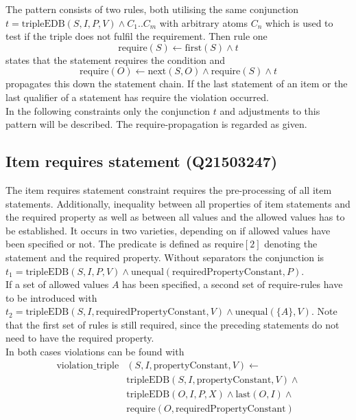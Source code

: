 \documentclass[hyperref,bachelorofscience,fleqn]{cgvpub}
\begin{document}
The pattern consists of two rules, both utilising the same conjunction \(t = \text{tripleEDB}(S, I, P, V) \wedge C_1 .. C_m\) with arbitrary atoms \(C_n\) which is used to test if the triple does not fulfil the requirement. Then rule one
\begin{equation*}
\text{require}(S) \leftarrow \text{first}(S) \wedge t
\end{equation*}
states that the statement requires the condition and
\begin{equation*}
\text{require}(O) \leftarrow \text{next}(S, O) \wedge \text{require}(S) \wedge t
\end{equation*}
propagates this down the statement chain. If the last statement of an item or the last qualifier of a statement has require the violation occurred.\\

In the following constraints only the conjunction \(t\) and adjustments to this pattern will be described. The require-propagation is regarded as given.

\subsection{Item requires statement (Q21503247)}
The item requires statement constraint requires the pre-processing of all item statements. Additionally, inequality between all properties of item statements and the required property as well as between all values and the allowed values has to be established. It occurs in two varieties, depending on if allowed values have been specified or not. The predicate is defined as require\([2]\) denoting the statement and the required property. Without separators the conjunction is \(t_1 = \text{tripleEDB}(S, I, P, V) \wedge \text{unequal}(\text{requiredPropertyConstant}, P)\).\\

If a set of allowed values \(A\) has been specified, a second set of require-rules have to be introduced with \(t_2 = \text{tripleEDB}(S, I, \text{requiredPropertyConstant}, V) \wedge \text{unequal}(\{A\}, V)\). Note that the first set of rules is still required, since the preceding statements do not need to have the required property.\\

In both cases violations can be found with
\begin{equation*}
\begin{split}
\text{violation\_triple}&(S, I, \text{propertyConstant}, V) \leftarrow \\
&\text{tripleEDB}(S, I, \text{propertyConstant}, V) \wedge \\
&\text{tripleEDB}(O, I, P, X) \wedge \text{last}(O, I) \wedge \\
&\text{require}(O, \text{requiredPropertyConstant})
\end{split}
\end{equation*}
\end{document}
